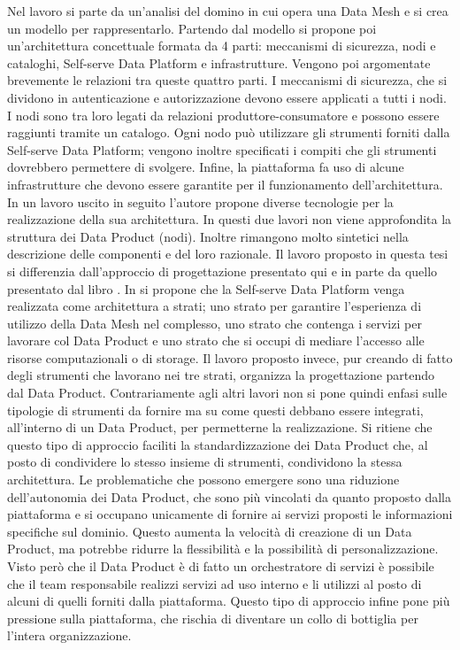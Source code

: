 \documentclass[12pt]{report}
\begin{document}
Nel lavoro si parte da un'analisi del domino in cui opera una Data Mesh e si crea un modello per rappresentarlo.
Partendo dal modello si propone poi un'architettura concettuale formata da 4 parti: meccanismi di sicurezza, nodi e cataloghi, Self-serve Data Platform e infrastrutture.
Vengono poi argomentate brevemente le relazioni tra queste quattro parti. 
I meccanismi di sicurezza, che si dividono in autenticazione e autorizzazione devono essere applicati a tutti i nodi. 
I nodi sono tra loro legati da relazioni produttore-consumatore e possono essere raggiunti tramite un catalogo. 
Ogni nodo può utilizzare gli strumenti forniti dalla Self-serve Data Platform; vengono inoltre specificati i compiti che gli strumenti dovrebbero permettere di svolgere.
Infine, la piattaforma fa uso di alcune infrastrutture che devono essere garantite per il funzionamento dell'architettura.
In un lavoro uscito in seguito \cite{araujo2022advancing} l'autore propone diverse tecnologie per la realizzazione della sua architettura.
In questi due lavori non viene approfondita la struttura dei Data Product (nodi). 
Inoltre rimangono molto sintetici nella descrizione delle componenti e del loro razionale.
Il lavoro proposto in questa tesi si differenzia dall'approccio di progettazione presentato qui e in parte da quello presentato dal libro \cite{dehghani_data_2022}.
In \cite{dehghani_data_2022} si propone che la Self-serve Data Platform venga realizzata come architettura a strati; uno strato per garantire l'esperienza di utilizzo della Data Mesh nel complesso, uno strato che contenga i servizi per lavorare col Data Product e uno strato che si occupi di mediare l'accesso alle risorse computazionali o di storage.
Il lavoro proposto invece, pur creando di fatto degli strumenti che lavorano nei tre strati, organizza la progettazione partendo dal Data Product. 
Contrariamente agli altri lavori non si pone quindi enfasi sulle tipologie di strumenti da fornire ma su come questi debbano essere integrati, all'interno di un Data Product, per permetterne la realizzazione.
Si ritiene che questo tipo di approccio faciliti la standardizzazione dei Data Product che, al posto di condividere lo stesso insieme di strumenti, condividono la stessa architettura.
Le problematiche che possono emergere sono una riduzione dell'autonomia dei Data Product, che sono più vincolati da quanto proposto dalla piattaforma e si occupano unicamente di fornire ai servizi proposti le informazioni specifiche sul dominio. 
Questo aumenta la velocità di creazione di un Data Product, ma potrebbe ridurre la flessibilità e la possibilità di personalizzazione.
Visto però che il Data Product è di fatto un orchestratore di servizi è possibile che il team responsabile realizzi servizi ad uso interno e li utilizzi al posto di alcuni di quelli forniti dalla piattaforma.
Questo tipo di approccio infine pone più pressione sulla piattaforma, che rischia di diventare un collo di bottiglia per l'intera organizzazione.
\end{document}
